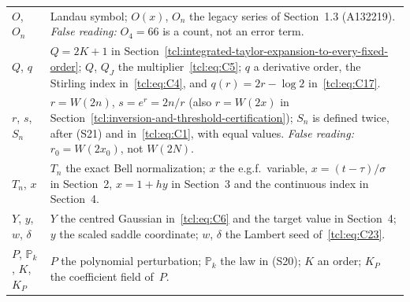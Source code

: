 \begin{longtable}{@{}>{\raggedright\arraybackslash}p{0.95in}>{\raggedright\arraybackslash}p{5.3in}@{}}
$O$, $O_n$ & Landau symbol; $O(x)$, $O_n$ the legacy series of Section~1.3 (A132219). \emph{False reading:} $O_4=66$ is a count, not an error term.\\
$Q$, $q$ & $Q=2K+1$ in Section~\ref{tcl:integrated-taylor-expansion-to-every-fixed-order}; $Q$, $Q_J$ the multiplier~\eqref{tcl:eq:C5}; $q$ a derivative order, the Stirling index in~\eqref{tcl:eq:C4}, and $q(r)=2r-\log2$ in~\eqref{tcl:eq:C17}.\\
$r$, $s$, $S_n$ & $r=W(2n)$, $s=e^r=2n/r$ (also $r=W(2x)$ in Section~\ref{tcl:inversion-and-threshold-certification}); $S_n$ is defined twice, after (S21) and in~\eqref{tcl:eq:C1}, with equal values. \emph{False reading:} $r_0=W(2x_0)$, not $W(2N)$.\\
$T_n$, $x$ & $T_n$ the exact Bell normalization; $x$ the e.g.f.\ variable, $x=(t-\tau)/\sigma$ in Section~2, $x=1+hy$ in Section~3 and the continuous index in Section~4.\\
$Y$, $y$, $w$, $\delta$ & $Y$ the centred Gaussian in~\eqref{tcl:eq:C6} and the target value in Section~4; $y$ the scaled saddle coordinate; $w$, $\delta$ the Lambert seed of~\eqref{tcl:eq:C23}.\\
$P$, $\mathbb P_k$, $K$, $K_P$ & $P$ the polynomial perturbation; $\mathbb P_k$ the law in (S20); $K$ an order; $K_P$ the coefficient field of~$P$.\\
\bottomrule
\end{longtable}
\endgroup
